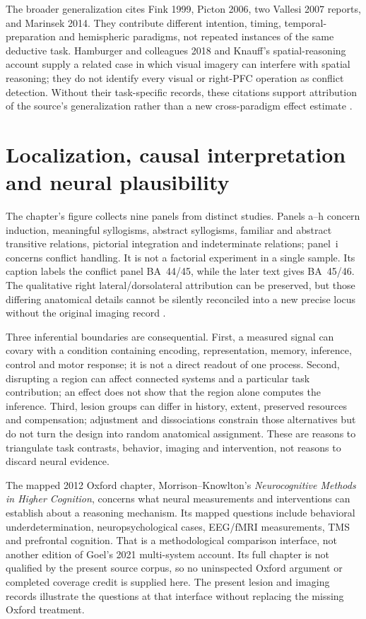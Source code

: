 The broader generalization cites Fink 1999, Picton 2006, two Vallesi
2007 reports, and Marinsek 2014. They contribute different intention,
timing, temporal-preparation and hemispheric paradigms, not repeated
instances of the same deductive task. Hamburger and colleagues 2018
and Knauff's spatial-reasoning account supply a related case in which
visual imagery can interfere with spatial reasoning; they do not
identify every visual or right-PFC operation as conflict detection.
Without their task-specific records, these citations support attribution
of the source's generalization rather than a new cross-paradigm effect
estimate \cite[p.~123]{Goel2021RationalityBrain}.

\section{Localization, causal interpretation and neural plausibility}
\label{sec:p19-r14-limits}

The chapter's figure collects nine panels from distinct studies. Panels
a--h concern induction, meaningful syllogisms, abstract syllogisms,
familiar and abstract transitive relations, pictorial integration and
indeterminate relations; panel~i concerns conflict handling. It is not
a factorial experiment in a single sample. Its caption labels the
conflict panel BA~44/45, while the later text gives BA~45/46. The
qualitative right lateral/dorsolateral attribution can be preserved,
but those differing anatomical details cannot be silently reconciled
into a new precise locus without the original imaging record
\cite[p.~119, fig.~1.4.1; p.~123]{Goel2021RationalityBrain}.

Three inferential boundaries are consequential. First, a measured
signal can covary with a condition containing encoding, representation,
memory, inference, control and motor response; it is not a direct readout
of one process. Second, disrupting a region can affect connected
systems and a particular task contribution; an effect does not show
that the region alone computes the inference. Third, lesion groups
can differ in history, extent, preserved resources and compensation;
adjustment and dissociations constrain those alternatives but do not
turn the design into random anatomical assignment. These are reasons
to triangulate task contrasts, behavior, imaging and intervention,
not reasons to discard neural evidence.

The mapped 2012 Oxford chapter, Morrison--Knowlton's \emph{Neurocognitive
Methods in Higher Cognition}, concerns what neural measurements and
interventions can establish about a reasoning mechanism. Its mapped
questions include behavioral underdetermination, neuropsychological
cases, EEG/fMRI measurements, TMS and prefrontal cognition. That is a
methodological comparison interface, not another edition of Goel's
2021 multi-system account. Its full chapter is not qualified by the
present source corpus, so no uninspected Oxford argument or completed
coverage credit is supplied here. The present lesion and imaging
records illustrate the questions at that interface without replacing
the missing Oxford treatment.

